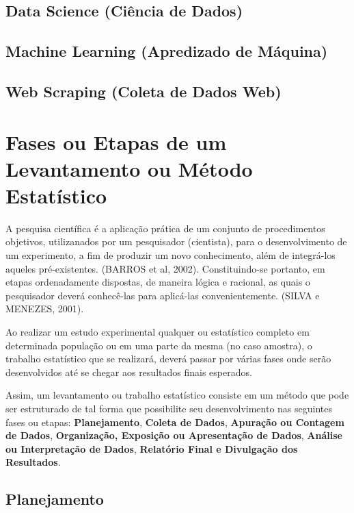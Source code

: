 \subsection{Data Science (Ciência de Dados)}

\subsection{Machine Learning (Apredizado de Máquina)}

\subsection{Web Scraping (Coleta de Dados Web)}



\newpage
\section{Fases ou Etapas de um Levantamento ou Método Estatístico}

\inic A pesquisa científica é a aplicação prática de um conjunto de procedimentos objetivos, utilizanados por um pesquisador (cientista), para o desenvolvimento de um experimento, a fim de produzir um novo conhecimento, além de integrá-los aqueles pré-existentes. (BARROS et al, 2002). Constituindo-se portanto, em etapas ordenadamente dispostas, de maneira lógica e racional, as quais o pesquisador deverá conhecê-las para aplicá-las convenientemente. (SILVA e MENEZES, 2001). 
\vskip0.3cm


Ao realizar um estudo experimental qualquer ou estatístico completo em determinada população ou em uma parte da mesma (no caso amostra), o trabalho estatístico que se realizará, deverá passar por várias fases onde serão desenvolvidos até se chegar aos resultados finais esperados.\vskip0.3cm

Assim, um levantamento ou trabalho estatístico consiste em um
método que pode ser estruturado de tal forma que possibilite seu
desenvolvimento nas seguintes fases ou etapas:
\textbf{Planejamento}, \textbf{Coleta de Dados}, \textbf{Apuração
ou Contagem de Dados}, \textbf{Organização, Exposição ou
Apresentação de Dados}, \textbf{Análise ou Interpretação de
Dados}, \textbf{Relatório Final e Divulgação dos Resultados}.


\subsection{Planejamento}

